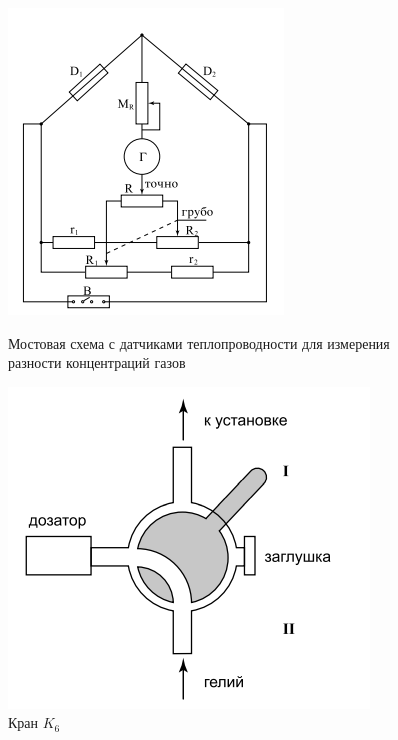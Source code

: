 \documentclass[a4paper,12pt]{article}
\begin{document}
\begin{figure}[h]
\begin{center}
\begin{minipage}[h]{0.4\linewidth}
\includegraphics[width=0.8\linewidth]{bridge.png}
\label{bridge}
\caption{Мостовая схема с датчиками теплопроводности для измерения разности концентраций газов} 
\end{minipage}
\hfill
\begin{minipage}[h]{0.5\linewidth}
\includegraphics[width=1\linewidth]{K_6.png}
\caption{Кран $K_6$}
\end{minipage}
\end{center}
\end{figure}
\end{document}
